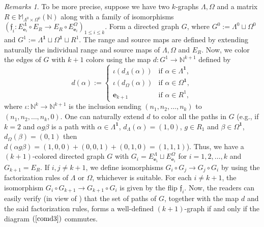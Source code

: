 \documentclass[12pt]{amsart}
\theoremstyle{definition}
\theoremstyle{remark}
\newtheorem{rmks}[thm]{Remarks}
\begin{document}
\begin{rmks}
To be more precise, suppose we have two $k$-graphs $\Lambda,\Omega$ and a matrix $R\in \mathbb{M}_{\Lambda^0\times \Omega^0}(\mathbb{N})$ along with a family of isomorphisms $(\mathfrak{f}_i:E_{\mathbf{e}_i}^\Lambda\circ E_R\longrightarrow E_R\circ E_{\mathbf{e}_i}^\Omega)_{1\le i \le k}$. Form a directed graph $G$, where $G^0:=\Lambda^0\sqcup \Omega^0$ and $G^1:=\Lambda^\mathbf{1}\sqcup \Omega^\mathbf{1} \sqcup R^1$. The range and source maps are defined by extending naturally the individual range and source maps of $\Lambda,\Omega$ and $E_R$. Now, we color the edges of $G$ with $k+1$ colors using the map $d:G^1\longrightarrow \mathbb{N}^{k+1}$ defined by 
$$d(\alpha) :=
	\left\{
	\begin{array}{lll}
		\iota(d_\Lambda(\alpha))  & \mbox{if } \alpha\in \Lambda^\mathbf{1}, \\
            \iota(d_\Omega(\alpha))  & \mbox{if } \alpha\in \Omega^\mathbf{1},\\
		\mathbf{e}_{k+1}  &  \mbox{if } \alpha\in R^1,
	\end{array}
	\right.$$ 
where $\iota:\mathbb{N}^k\longrightarrow \mathbb{N}^{k+1}$ is the inclusion sending $(n_1,n_2,\ldots,n_k)$ to $(n_1,n_2,\ldots,n_k,0)$. One can naturally extend $d$ to color all the paths in $G$ (e.g., if $k=2$ and $\alpha g\beta$ is a path with $\alpha\in \Lambda^\mathbf{1}$, $d_\Lambda(\alpha)=(1,0)$, $g\in R_1$ and $\beta\in \Omega^\mathbf{1}$, $d_\Omega(\beta)=(0,1)$ then $d(\alpha g\beta)=(1,0,0)+(0,0,1)+(0,1,0)=(1,1,1)$). Thus, we have a $(k+1)$-colored directed graph $G$ with $G_i=E_{\mathbf{e}_i}^\Lambda\sqcup E_{\mathbf{e}_i}^\Omega$ for $i=1,2,\ldots,k$ and $G_{k+1}=E_R$. If $i,j\neq k+1$, we define isomorphisms $G_i\circ G_j\longrightarrow G_j\circ G_i$ by using the factorization rules of $\Lambda$ or $\Omega$, whichever is suitable. For each $i\neq k+1$, the isomorphism $G_i\circ G_{k+1}\longrightarrow G_{k+1}\circ G_i$ is given by the flip $\mathfrak{f}_i$. Now, the readers can easily verify (in view of \cite[Remark 2.3]{Fowler}) that the set of paths of $G$, together with the map $d$ and the said factorization rules, forms a well-defined $(k+1)$-graph if and only if the diagram $(\ref{comd3})$ commutes. 


\end{rmks}
\end{document}
